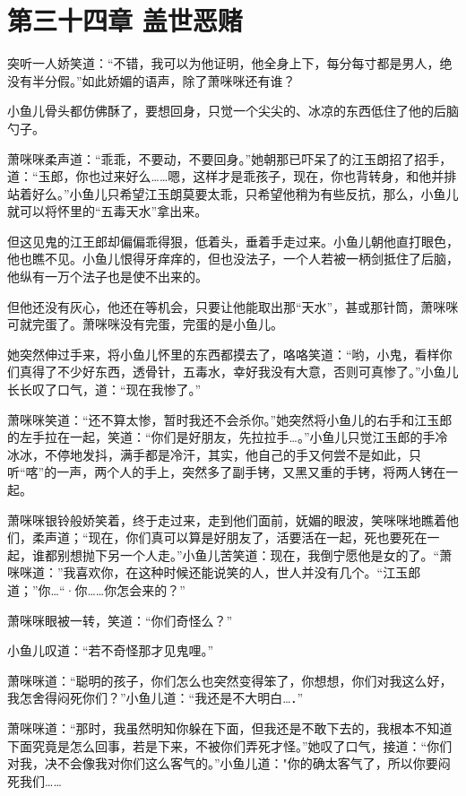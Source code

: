 \documentclass[12pt,oneside]{book}
\begin{document}
\hypertarget{ux7b2cux4e09ux5341ux56dbux7ae0-ux76d6ux4e16ux6076ux8d4c}{%
\chapter{第三十四章
盖世恶赌}\label{ux7b2cux4e09ux5341ux56dbux7ae0-ux76d6ux4e16ux6076ux8d4c}}

突听一人娇笑道：``不错，我可以为他证明，他全身上下，每分每寸都是男人，绝没有半分假。''如此娇媚的语声，除了萧咪咪还有谁？

小鱼儿骨头都仿佛酥了，要想回身，只觉一个尖尖的、冰凉的东西低住了他的后脑勺子。

萧咪咪柔声道：``乖乖，不要动，不要回身。''她朝那已吓呆了的江玉朗招了招手，道：``玉郎，你也过来好么\ldots\ldots 嗯，这样才是乖孩子，现在，你也背转身，和他并排站着好么。''小鱼儿只希望江玉朗莫要太乖，只希望他稍为有些反抗，那么，小鱼儿就可以将怀里的``五毒天水''拿出来。

但这见鬼的江王郎却偏偏乖得狠，低着头，垂着手走过来。小鱼儿朝他直打眼色，他也瞧不见。小鱼儿恨得牙痒痒的，但也没法子，一个人若被一柄剑抵住了后脑，他纵有一万个法子也是使不出来的。

但他还没有灰心，他还在等机会，只要让他能取出那``天水''，甚或那针筒，萧咪咪可就完蛋了。萧咪咪没有完蛋，完蛋的是小鱼儿。

她突然伸过手来，将小鱼儿怀里的东西都摸去了，咯咯笑道：``哟，小鬼，看样你们真得了不少好东西，透骨针，五毒水，幸好我没有大意，否则可真惨了。''小鱼儿长长叹了口气，道：``现在我惨了。''

萧咪咪笑道：``还不算太惨，暂时我还不会杀你。''她突然将小鱼儿的右手和江玉郎的左手拉在一起，笑道：``你们是好朋友，先拉拉手\ldots。''小鱼儿只觉江玉郎的手冷冰冰，不停地发抖，满手都是冷汗，其实，他自己的手又何尝不是如此，只听``喀''的一声，两个人的手上，突然多了副手铐，又黑又重的手铐，将两人铐在一起。

萧咪咪银铃般娇笑着，终于走过来，走到他们面前，妩媚的眼波，笑咪咪地瞧着他们，柔声道；``现在，你们真可以算是好朋友了，活要活在一起，死也要死在一起，谁都别想抛下另一个人走。''小鱼儿苦笑道：现在，我倒宁愿他是女的了。``萧咪咪道：''我喜欢你，在这种时候还能说笑的人，世人并没有几个。``江玉郎道；''你\ldots{}``·你\ldots\ldots 你怎会来的？''

萧咪咪眼被一转，笑道：``你们奇怪么？''

小鱼儿叹道：``若不奇怪那才见鬼哩。''

萧咪咪道：``聪明的孩子，你们怎么也突然变得笨了，你想想，你们对我这么好，我怎舍得闷死你们？''小鱼儿道：``我还是不大明白\ldots．''

萧咪咪道：``那时，我虽然明知你躲在下面，但我还是不敢下去的，我根本不知道下面究竟是怎么回事，若是下来，不被你们弄死才怪。''她叹了口气，接道：``你们对我，决不会像我对你们这么客气的。''小鱼儿道："你的确太客气了，所以你要闷死我们\ldots\ldots{}
\end{document}
